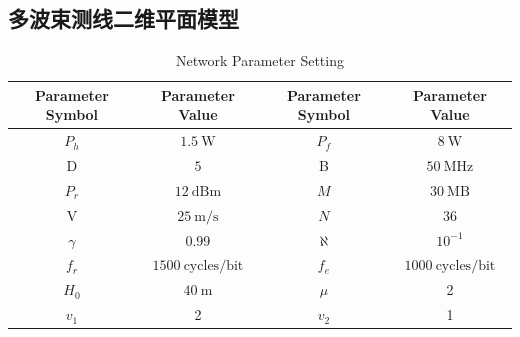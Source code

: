 \documentclass[withoutpreface,bwprint]{cumcmthesis} %
\begin{document}
    \subsection{多波束测线二维平面模型}

    \begin{table}[H]
        \caption{Network Parameter Setting}
        \centering
        \begin{tabular}{|c|c|c|c|}
          \hline
          Parameter Symbol&Parameter Value&Parameter Symbol&Parameter Value\\
          \hline
          $P_{h}$&$1.5 \mathrm{~ W}$&$P_{f}$&$8 \mathrm{~ W}$\\
          \hline
          D&$5 $&B&$50 \mathrm{~ MHz}$\\
          \hline
          $P_{r}$&$12 \mathrm{~ dBm}$&$M$&$30 \mathrm{~ MB}$\\
          \hline
          V&$25 \mathrm{~ m/s}$&$N$&36\\
          \hline
          $\gamma$&0.99&$\aleph$&$10^{-1}$\\
          \hline
          $f_r$&$1500 \mathrm{~ cycles/bit}$&$f_e$&$1000 \mathrm{~ cycles/bit}$\\
          \hline
          $H_0$&$40 \mathrm{~ m}$&$\mu$&2\\
          \hline
          $v_1$&2&$v_2$&1\\
          \hline
        \end{tabular}
      \end{table}
\end{document}
